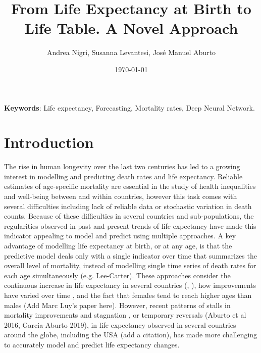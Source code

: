 \documentclass[a4,11pt]{article}
\title{From Life Expectancy at Birth to Life Table. A Novel Approach}
\author{Andrea Nigri, Susanna Levantesi, Jos\'e Manuel Aburto}
\date{\today}
\begin{document}
	\maketitle
	\bigskip
	\begin{flushleft}
		\textbf{Keywords}: Life expectancy, Forecasting, Mortality rates, Deep Neural Network.
	\end{flushleft}
	
\section{Introduction}
The rise in human longevity over the last two centuries has led to a growing interest in modelling and predicting death rates and life expectancy. Reliable estimates of age-specific mortality are essential in the study of health inequalities and well-being between and within countries, however this task comes with several difficulties including lack of reliable data or stochastic variation in death counts. Because of these difficulties in several countries and sub-populations, the regularities observed in past and present trends of life expectancy have made this indicator appealing to model and predict using multiple approaches. A key advantage of modelling life expectancy at birth, or at any age, is that the predictive model deals only with a single indicator over time that summarizes the overall level of mortality, instead of modelling single time series of death rates for each age simultaneously (e.g. Lee-Carter). These approaches consider the continuous increase in life expectancy in several countries (\cite{HM}, \cite{OV2002}), how improvements have varied over time \citet{Vallin}, and the fact that females tend to reach higher ages than males (Add Marc Luy's paper here). However, recent patterns of stalls in mortality improvements and stagnation \cite{Ho}, or temporary reversals (Aburto et al 2016, Garcia-Aburto 2019), in life expectancy observed in several countries around the globe, including the USA (add a citation), has made more challenging to accurately model and predict life expectancy changes.\\

 

 
\end{document}
